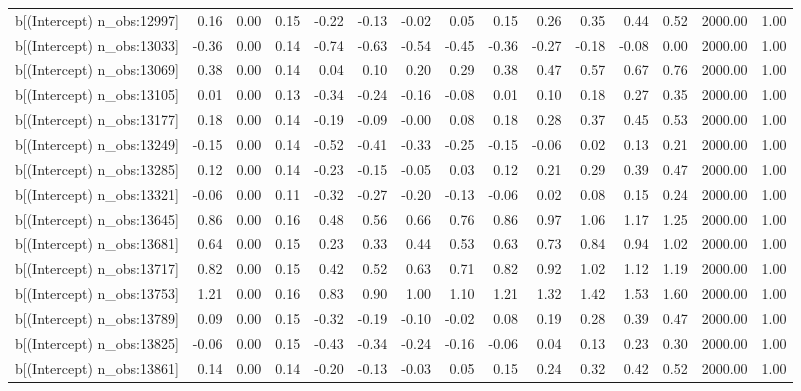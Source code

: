 \begin{table}[ht]
\begin{tabular}{rrrrrrrrrrrrrrr}
  b[(Intercept) n\_obs:12997] & 0.16 & 0.00 & 0.15 & -0.22 & -0.13 & -0.02 & 0.05 & 0.15 & 0.26 & 0.35 & 0.44 & 0.52 & 2000.00 & 1.00 \\ 
  b[(Intercept) n\_obs:13033] & -0.36 & 0.00 & 0.14 & -0.74 & -0.63 & -0.54 & -0.45 & -0.36 & -0.27 & -0.18 & -0.08 & 0.00 & 2000.00 & 1.00 \\ 
  b[(Intercept) n\_obs:13069] & 0.38 & 0.00 & 0.14 & 0.04 & 0.10 & 0.20 & 0.29 & 0.38 & 0.47 & 0.57 & 0.67 & 0.76 & 2000.00 & 1.00 \\ 
  b[(Intercept) n\_obs:13105] & 0.01 & 0.00 & 0.13 & -0.34 & -0.24 & -0.16 & -0.08 & 0.01 & 0.10 & 0.18 & 0.27 & 0.35 & 2000.00 & 1.00 \\ 
  b[(Intercept) n\_obs:13177] & 0.18 & 0.00 & 0.14 & -0.19 & -0.09 & -0.00 & 0.08 & 0.18 & 0.28 & 0.37 & 0.45 & 0.53 & 2000.00 & 1.00 \\ 
  b[(Intercept) n\_obs:13249] & -0.15 & 0.00 & 0.14 & -0.52 & -0.41 & -0.33 & -0.25 & -0.15 & -0.06 & 0.02 & 0.13 & 0.21 & 2000.00 & 1.00 \\ 
  b[(Intercept) n\_obs:13285] & 0.12 & 0.00 & 0.14 & -0.23 & -0.15 & -0.05 & 0.03 & 0.12 & 0.21 & 0.29 & 0.39 & 0.47 & 2000.00 & 1.00 \\ 
  b[(Intercept) n\_obs:13321] & -0.06 & 0.00 & 0.11 & -0.32 & -0.27 & -0.20 & -0.13 & -0.06 & 0.02 & 0.08 & 0.15 & 0.24 & 2000.00 & 1.00 \\ 
  b[(Intercept) n\_obs:13645] & 0.86 & 0.00 & 0.16 & 0.48 & 0.56 & 0.66 & 0.76 & 0.86 & 0.97 & 1.06 & 1.17 & 1.25 & 2000.00 & 1.00 \\ 
  b[(Intercept) n\_obs:13681] & 0.64 & 0.00 & 0.15 & 0.23 & 0.33 & 0.44 & 0.53 & 0.63 & 0.73 & 0.84 & 0.94 & 1.02 & 2000.00 & 1.00 \\ 
  b[(Intercept) n\_obs:13717] & 0.82 & 0.00 & 0.15 & 0.42 & 0.52 & 0.63 & 0.71 & 0.82 & 0.92 & 1.02 & 1.12 & 1.19 & 2000.00 & 1.00 \\ 
  b[(Intercept) n\_obs:13753] & 1.21 & 0.00 & 0.16 & 0.83 & 0.90 & 1.00 & 1.10 & 1.21 & 1.32 & 1.42 & 1.53 & 1.60 & 2000.00 & 1.00 \\ 
  b[(Intercept) n\_obs:13789] & 0.09 & 0.00 & 0.15 & -0.32 & -0.19 & -0.10 & -0.02 & 0.08 & 0.19 & 0.28 & 0.39 & 0.47 & 2000.00 & 1.00 \\ 
  b[(Intercept) n\_obs:13825] & -0.06 & 0.00 & 0.15 & -0.43 & -0.34 & -0.24 & -0.16 & -0.06 & 0.04 & 0.13 & 0.23 & 0.30 & 2000.00 & 1.00 \\ 
  b[(Intercept) n\_obs:13861] & 0.14 & 0.00 & 0.14 & -0.20 & -0.13 & -0.03 & 0.05 & 0.15 & 0.24 & 0.32 & 0.42 & 0.52 & 2000.00 & 1.00 \\ 

\end{tabular}
\end{table}
